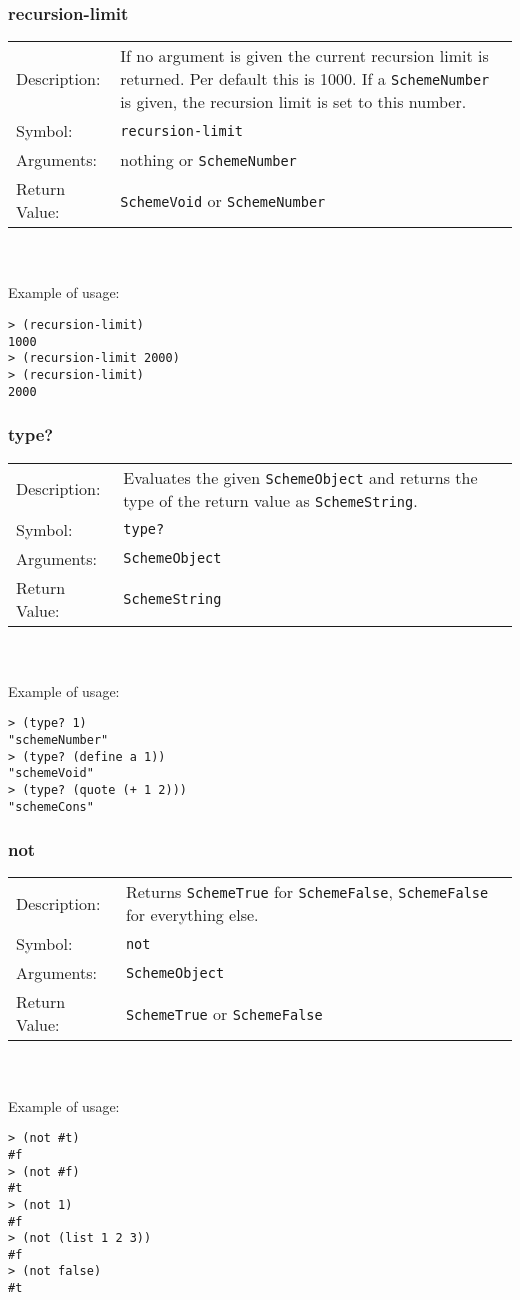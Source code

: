 \documentclass[12pt,a4paper]{scrartcl}
\begin{document}
\subsubsection{recursion-limit}
\begin{tabular}{l  p{13cm}}
Description: & If no argument is given the current recursion limit is returned. Per default this is 1000. If a \lstinline{SchemeNumber} is given, the recursion limit is set to this number.\\
Symbol: & \lstinline{recursion-limit}\\
Arguments: & nothing or \lstinline{SchemeNumber}\\
Return Value: & \lstinline{SchemeVoid} or \lstinline{SchemeNumber}
\end{tabular}
\\
\\
Example of usage:
\begin{lstlisting}
> (recursion-limit)
1000
> (recursion-limit 2000)
> (recursion-limit)
2000
\end{lstlisting}

\subsubsection{type?}
\begin{tabular}{l  p{13cm}}
Description: & Evaluates the given \lstinline{SchemeObject} and returns the type of the return value as \lstinline{SchemeString}.\\
Symbol: & \lstinline{type?}\\
Arguments: & \lstinline{SchemeObject}\\
Return Value: & \lstinline{SchemeString}
\end{tabular}
\\
\\
Example of usage:
\begin{lstlisting}
> (type? 1)
"schemeNumber"
> (type? (define a 1))
"schemeVoid"
> (type? (quote (+ 1 2)))
"schemeCons"
\end{lstlisting}

\subsubsection{not}
\begin{tabular}{l  p{13cm}}
Description: & Returns \lstinline{SchemeTrue} for \lstinline{SchemeFalse}, \lstinline{SchemeFalse} for everything else.\\
Symbol: & \lstinline{not}\\
Arguments: & \lstinline{SchemeObject}\\
Return Value: & \lstinline{SchemeTrue} or \lstinline{SchemeFalse}
\end{tabular}
\\
\\
Example of usage:
\begin{lstlisting}
> (not #t)
#f
> (not #f)
#t
> (not 1)
#f
> (not (list 1 2 3))
#f
> (not false)
#t
\end{lstlisting}
\end{document}
